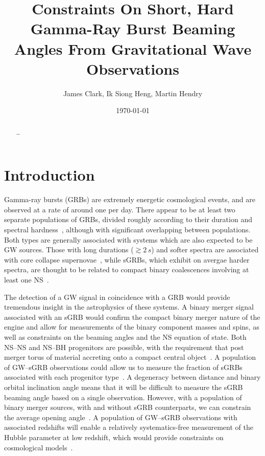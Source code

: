 \documentclass[twocolumn,nofootinbib]{revtex4-1}
\newcommand{\BNS}{\ac{NS}--\ac{NS}\xspace}
\newcommand{\NSBH}{\ac{NS}--\ac{BH}\xspace}
\newcommand{\JOINT}{\ac{GW}--\ac{sGRB}\xspace}
\begin{document}
\title{Constraints On Short, Hard Gamma-Ray Burst Beaming Angles From
Gravitational Wave Observations}
\author{James Clark, Ik Siong Heng, Martin Hendry}
\date{\today}

\begin{abstract}
\dots
\end{abstract}

\maketitle

\section{Introduction}
Gamma-ray bursts (GRBs) are extremely energetic cosmological events, and are observed at a rate of around one per day.
There appear to be at least two separate populations of \acp{GRB}, divided roughly according to their duration and spectral hardness~\cite{Kouveliotou:1993yx}, although with significant overlapping between populations.
Both types are generally associated with systems which are also expected to be \ac{GW} sources.
Those with long durations ($\gtrsim 2\,s$) and softer spectra are associated with core collapse supernovae~\cite{Galama:1998ea,MacFadyen:1998vz,Woosley:2006fn}, while \acp{sGRB}, which exhibit on avergae harder spectra, are thought to be related to compact binary coalescences involving at least one \ac{NS}~\cite{Eichler:1989ve,Paczynski:1991aq,Narayan:1992iy,Lee:2007js}.

The detection of a \ac{GW} signal in coincidence with a \ac{GRB} would provide tremendous insight in the  astrophysics of these systems.
A binary merger signal associated with an \ac{sGRB} would confirm the compact binary merger nature of the engine and allow for measurements of the binary component masses and spins, as well as constraints on the beaming angles and the \ac{NS} equation of state.
Both \BNS and \NSBH progenitors are possible, with the requirement that post merger torus of material accreting onto a compact central object~\cite{Blandford:1977ds,Rosswog:2002rt,Giacomazzo:2012zt}.
A population of \JOINT observations could allow us to measure the fraction of \acp{sGRB} associated with each progenitor type~\cite{Kreidberg:2012ud}.
A degeneracy between distance and binary orbital inclination angle means that it will be difficult to measure the \ac{sGRB} beaming angle based on a single observation.
However, with a population of binary merger sources, with and without \ac{sGRB} counterparts, we can constrain the average opening angle~\cite{Clark:2014jpa}.
A population of \JOINT observations with associated redshifts will enable a relatively systematics-free measurement of the Hubble parameter at low redshift, which would provide constraints on cosmological models~\cite{Schutz:1986gp,Chen:2012qh}.
\end{document}

